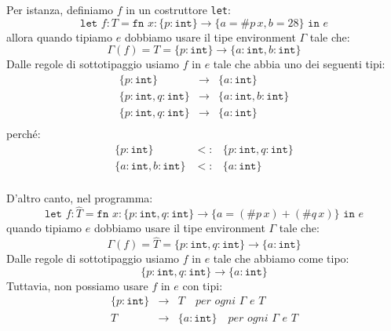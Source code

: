 Per istanza, definiamo $f$ in un costruttore \texttt{let}:
\[
    \texttt{let } f : T = \texttt{fn } x :
    \{ p : \texttt{int} \} \rightarrow 
    \{ a = \# p\, x , b = 28\} \texttt{ in } e
\]
allora quando tipiamo $e$ dobbiamo usare il tipe environment $\Gamma$ 
tale che:
\[
    \Gamma (f) = T = \{ p : \texttt{int} \} \rightarrow
    \{ a : \texttt{int}, b : \texttt{int} \}
\]
Dalle regole di sottotipaggio usiamo $f$ in $e$ tale che abbia uno 
dei seguenti tipi:
\[
\begin{array}{lll}
    \{ p : \texttt{int} \} & \rightarrow & \{ a : \texttt{int} \}\\
    \{ p : \texttt{int}, q: \texttt{int} \} & \rightarrow & \{ a : \texttt{int}, b : \texttt{int} \}\\
    \{ p : \texttt{int}, q: \texttt{int}\} & \rightarrow & \{ a : \texttt{int}\}\\
\end{array}
\]
perché:
\[
  \begin{array}{lll}
    \{ p : \texttt{int} \} & <: & \{ p : \texttt{int}, q: \texttt{int} \}\\
    \{ a : \texttt{int}, b : \texttt{int} \} & <: & \{ a : \texttt{int} \}\\
  \end{array}  
\]

D'altro canto, nel programma:
\[
    \texttt{let } f : \hat{T} = \texttt{fn } x :
    \{ p : \texttt{int}, q: \texttt{int} \} \rightarrow 
    \{ a = (\# p\,x) + (\# q\,x)\} \texttt{ in } e
\]
quando tipiamo $e$ dobbiamo usare il tipe environment $\Gamma$ tale che:
\[
  \Gamma(f) = \hat{T} = \{ p : \texttt{int}, q: \texttt{int} \}
  \rightarrow \{ a : \texttt{int} \}  
\]
Dalle regole di sottotipaggio usiamo $f$ in $e$ tale che abbiamo come 
tipo:
\[
    \{ p : \texttt{int}, q: \texttt{int} \} \rightarrow
    \{ a : \texttt{int} \}
\]
Tuttavia, non possiamo usare $f$ in $e$ con tipi:
\[
  \begin{array}{lll}
    \{ p : \texttt{int} \} & \rightarrow & T \quad \textit{per ogni } \Gamma \textit{ e } T\\
    T & \rightarrow & \{ a : \texttt{int} \} \quad \textit{per ogni } \Gamma \textit{ e } T\\
  \end{array}  
\]
